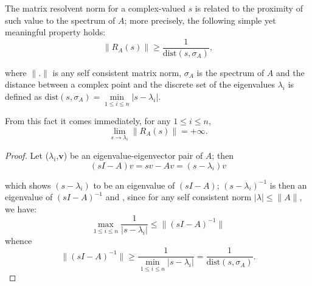 \documentclass[12pt]{article}
\begin{document}
The matrix resolvent norm for a complex-valued $s$ is related to the proximity of such value to the spectrum of $A$; more precisely, the following simple yet meaningful property holds:
\[
\|R_A(s)\|\geq\frac{1}{\mathrm{dist}(s,\sigma_A)},
\]

where $\|.\|$ is any self consistent matrix norm, $\sigma_A$ is the spectrum of $A$ and the distance between a complex point and the discrete set of the eigenvalues $\lambda_i$ is defined as $\mathrm{dist}(s,\sigma_A)=\min\limits_{1\leq i\leq n}|s-\lambda_i|$.

From this fact it comes immediately, for any $1\leq i\leq n$,
\[
\lim_{s\rightarrow\lambda_i}\|R_A(s)\|=+\infty.
\]

\bigskip

\begin{proof}

Let ($\lambda_i$,$\mathbf{v}$) be an eigenvalue-eigenvector pair of $A$; then
\[
(sI-A)v=sv-Av=(s-\lambda_i)v
\]

which shows $(s-\lambda_i)$ to be an eigenvalue of $(sI-A)$; $(s-\lambda_i)^{-1}$ is then an eigenvalue of $(sI-A)^{-1}$ and , since for any self consistent norm $|\lambda|\leq \|A\|$, we have:
\[
\max\limits_{1\leq i\leq n}\frac{1}{|s-\lambda_i|}\leq\|(sI-A)^{-1}\|
\]
whence
\[
\|(sI-A)^{-1}\|\geq\frac{1}{\min\limits_{1\leq i\leq n}|s-\lambda_i|}=\frac{1}{\mathrm{dist}(s,\sigma_A)}.
\]
\end{proof}
\end{document}
